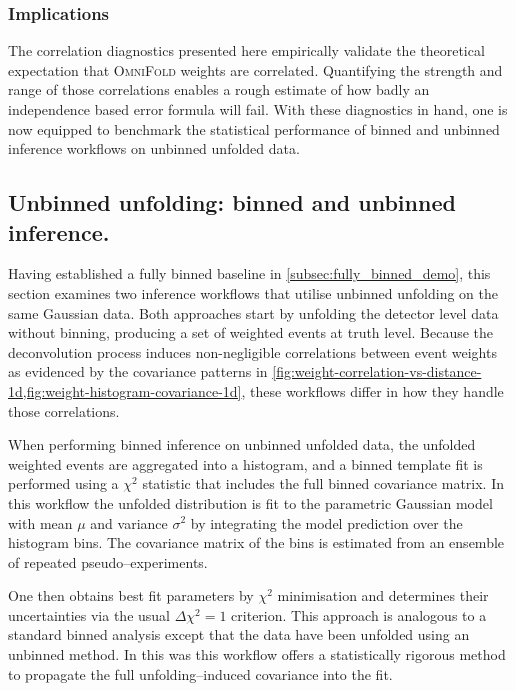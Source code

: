 \addtocounter{footnote}{-2}
        \subsubsection{Implications}
            The correlation diagnostics presented here {empirically validate} the theoretical expectation that \textsc{OmniFold} weights are correlated.
            Quantifying the strength and range of those correlations enables a rough estimate of how badly an independence based error formula will fail.
            With these diagnostics in hand, one is now equipped to benchmark the statistical performance of binned and unbinned inference workflows on unbinned unfolded data.
    \subsection{Unbinned unfolding: binned and unbinned inference.}
    \label{subsec:unbinned_data}
        Having established a fully binned baseline in \cref{subsec:fully_binned_demo}, this section examines two inference workflows that utilise unbinned unfolding on the same Gaussian data.
        Both approaches start by unfolding the detector level data without binning, producing a set of weighted events at truth level.
        Because the deconvolution process induces non-negligible correlations between event weights as evidenced by the covariance patterns in \cref{fig:weight-correlation-vs-distance-1d,fig:weight-histogram-covariance-1d}, these workflows differ in how they handle those correlations.
    
        When performing binned inference on unbinned unfolded data, the unfolded weighted events are aggregated into a histogram, and a binned template fit is performed using a $\chi^2$ statistic that includes the full binned covariance matrix.
        In this workflow the unfolded distribution is fit to the parametric Gaussian model with mean $\mu$ and variance $\sigma^2$ by integrating the model prediction over the histogram bins.
        The covariance matrix of the bins is estimated from an ensemble of repeated pseudo--experiments.
        
        One then obtains best fit parameters by $\chi^2$ minimisation and determines their uncertainties via the usual $\Delta\chi^2=1$ criterion.
        This approach is analogous to a standard binned analysis except that the data have been unfolded using an unbinned method.
        In this was this workflow offers a statistically rigorous method to propagate the full unfolding--induced covariance into the fit.
    
